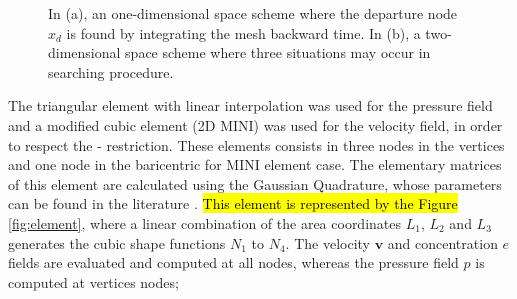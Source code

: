 \documentclass[10pt,fleqn,a4paper,twoside]{article}
\begin{document}
\begin{figure}[H]
\begin{center}
\end{center}
\caption{In (a), an one-dimensional space scheme
 where the departure node $x_{d}$ is found by integrating the 
mesh backward time. In (b), a two-dimensional space scheme
where three situations may occur in searching procedure.}
\label{semi-lagrangian figure}
\end{figure}

\medskip
The triangular element with linear interpolation was used
for the pressure field and a modified cubic element 
(2D MINI) was used
for the velocity field, 
in order to respect the
\citeauthor{babuska1971}-\citeauthor{brezzi1974} restriction.
These elements consists in three nodes in the vertices
and one node in the baricentric for MINI element case.
The elementary matrices of 
this element are calculated using the Gaussian Quadrature, 
whose parameters can be found in the literature \citep{cowper1973}. 
\hl{This element is represented by the Figure} \ref{fig:element},
\noindent
where
a linear combination of the area
coordinates
$L_1$,
$L_2$ and
$L_3$
generates the cubic shape functions
$N_1$ to $N_4$.
The velocity $\textbf{v}$ and
concentration $e$ fields
are evaluated and computed at all nodes, whereas
the pressure field $p$ is computed at vertices nodes; 
\end{document}
